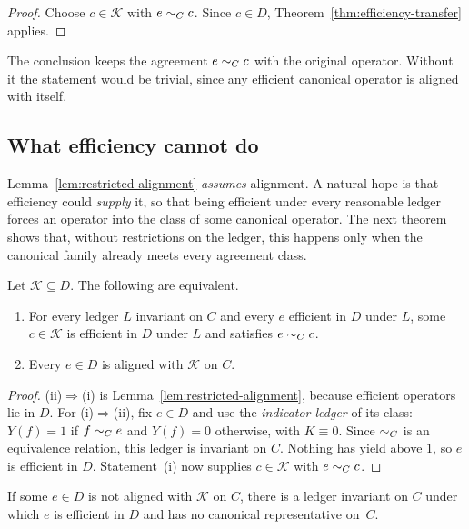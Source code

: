 \begin{proof}
Choose $c\in\mathcal{K}$ with $e\mathrel{\sim_{C}}c$. Since $c\in D$, Theorem~\ref{thm:efficiency-transfer} applies.
\end{proof}

The conclusion keeps the agreement $e\mathrel{\sim_{C}}c$ with the original operator. Without it the statement would be trivial, since any efficient canonical operator is aligned with itself.

\subsection{What efficiency cannot do}

Lemma~\ref{lem:restricted-alignment} \emph{assumes} alignment. A natural hope is that efficiency could \emph{supply} it, so that being efficient under every reasonable ledger forces an operator into the class of some canonical operator. The next theorem shows that, without restrictions on the ledger, this happens only when the canonical family already meets every agreement class.

\begin{theorem}\label{thm:ledger-boundary}
Let $\mathcal{K}\subseteq D$. The following are equivalent.
\begin{enumerate}
\item[\textup{(i)}] For every ledger $L$ invariant on $C$ and every $e$ efficient in $D$ under $L$, some $c\in\mathcal{K}$ is efficient in $D$ under $L$ and satisfies $e\mathrel{\sim_{C}}c$.
\item[\textup{(ii)}] Every $e\in D$ is aligned with $\mathcal{K}$ on $C$.
\end{enumerate}
\end{theorem}

\begin{proof}
(ii)$\Rightarrow$(i) is Lemma~\ref{lem:restricted-alignment}, because efficient operators lie in $D$. For (i)$\Rightarrow$(ii), fix $e\in D$ and use the \emph{indicator ledger} of its class: $Y(f)=1$ if $f\mathrel{\sim_{C}}e$ and $Y(f)=0$ otherwise, with $K\equiv 0$. Since $\mathrel{\sim_{C}}$ is an equivalence relation, this ledger is invariant on $C$. Nothing has yield above $1$, so $e$ is efficient in $D$. Statement~(i) now supplies $c\in\mathcal{K}$ with $e\mathrel{\sim_{C}}c$.
\end{proof}

\begin{corollary}[Counterledger]\label{cor:counterledger}
If some $e\in D$ is not aligned with $\mathcal{K}$ on $C$, there is a ledger invariant on $C$ under which $e$ is efficient in $D$ and has no canonical representative on~$C$.
\end{corollary}

